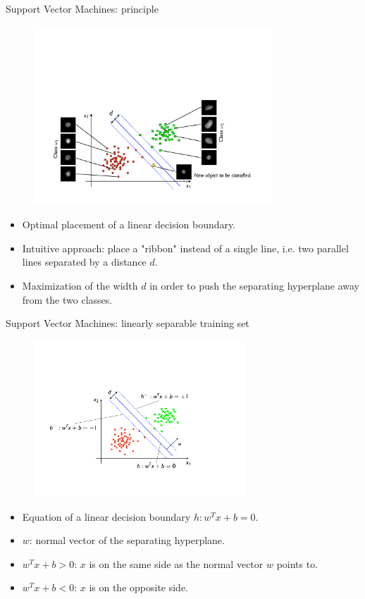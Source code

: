 \documentclass[xcolor=pdftex,dvipsnames,table]{beamer}
\begin{document}
\begin{frame}{Support Vector Machines: principle}
	\begin{figure}[htb]
		\includegraphics[width=0.8\textwidth]{../graphics/SVM1.pdf}
	\end{figure}
	\begin{itemize}
		\item Optimal placement of a linear decision boundary. 
		\item Intuitive approach: place a "ribbon" instead of a single line, i.e. two parallel lines separated by a distance $d$.
		\item Maximization of the width $d$ in order to push the separating hyperplane away from the two classes.
	\end{itemize}
\end{frame}

\begin{frame}{Support Vector Machines: linearly separable training set}
	\begin{figure}[htb]
		\includegraphics[width=0.7\textwidth]{../graphics/SVM2.pdf}
	\end{figure}
	\begin{itemize}
		\item Equation of a linear decision boundary $h: w^Tx + b = 0$. 
		\item $w$: normal vector of the separating hyperplane.
		\item $w^Tx + b  > 0$: $x$ is on the same side as the normal vector $w$ points to. 
		\item $w^Tx + b  < 0$: $x$ is on the opposite side.
	\end{itemize}
\end{frame}
\end{document}

